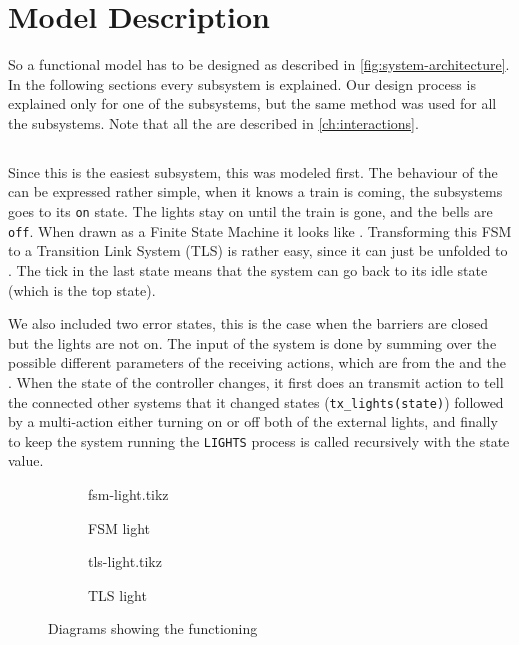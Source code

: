 \documentclass[final]{report}
\begin{document}
\chapter{Model Description}
So a functional model has to be designed as described in \cref{fig:system-architecture}.
In the following sections every subsystem is explained.
Our design process is explained only for one of the subsystems, but the same method was used for all the subsystems.
Note that all the  are described in \cref{ch:interactions}.


\section{}
Since this is the easiest subsystem, this was modeled first.
The behaviour of the  can be expressed rather simple, when it knows a train is coming, the subsystems goes to its \texttt{on} state.
The lights stay on until the train is gone, and the bells are \texttt{off}.
When drawn as a Finite State Machine it looks like \label{fig:fsm-light}.
Transforming this FSM to a Transition Link System (TLS) is rather easy, since it can just be unfolded to \label{fig:tls-light}.
The tick in the last state means that the system can go back to its idle state (which is the top state).

We also included two error states, this is the case when the barriers are closed but the lights are not on.
The input of the system is done by summing over the possible different parameters of the receiving actions, which are from the  and the .
When the state of the controller changes, it first does an transmit action to tell the connected other systems that it changed states (\texttt{tx\_lights(state)}) followed by a multi-action either turning on or off both of the external lights, and finally to keep the system running the \texttt{LIGHTS} process is called recursively with the state value.

\begin{figure}[H]
    \centering
        \begin{subfigure}[b]{0.4\textwidth}
    \centering
            {fsm-light.tikz}
            \caption{FSM light}
            \label{fig:fsm-light}
        \end{subfigure}
        \begin{subfigure}[b]{0.4\textwidth}
    \centering
            {tls-light.tikz}
            \caption{TLS light}
            \label{fig:tls-light}
        \end{subfigure}
    \caption{Diagrams showing the functioning }
    \label{fig:light}
\end{figure}
\end{document}
